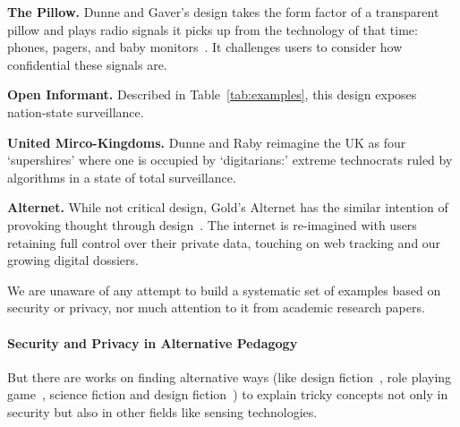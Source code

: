 \begin{compactlist}
\item \textbf{The Pillow.} Dunne and Gaver's design takes the form factor of a transparent pillow and plays radio signals it picks up from the technology of that time: \eg phones, pagers, and baby monitors~\cite{DuGa97}. It challenges users to consider how confidential these signals are.  
\item \textbf{Open Informant.} Described in Table~\ref{tab:examples}, this design exposes nation-state surveillance.
\item \textbf{United Mirco-Kingdoms.} Dunne and Raby reimagine the UK as four `supershires' where one is occupied by `digitarians:' extreme technocrats ruled by algorithms in a state of total surveillance.  
\item \textbf{Alternet.} While not critical design, Gold's Alternet has the similar intention of provoking thought through design~\cite{Gol14}. The internet is re-imagined with users retaining full control over their private data, touching on web tracking and our growing digital dossiers. 
\end{compactlist}

We are unaware of any attempt to build a systematic set of examples based on security or privacy, nor much attention to it from academic research papers. %


\paragraph{Security and Privacy in Alternative Pedagogy}

But there are works on finding alternative ways (like design fiction~\cite{loureiro-koechlin_vision_2022}, role playing game~\cite{merrill_security_2020}, science fiction and design fiction~\cite{wong_real-fictional_2017}) to explain tricky concepts not only in security but also in other fields like sensing technologies.


